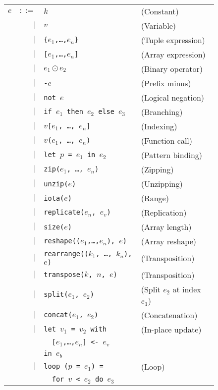 \documentclass[oneside]{memoir}
\begin{document}
\begin{figure}[bt]
\begin{tabular}{lrll}
$e$ & $::=$ & $k$ & (Constant)\\
& $|$ & $v$ & (Variable)\\
& $|$ & \texttt{\{$e_{1}$,\ldots,$e_{n}$\}} & (Tuple expression) \\
& $|$ & \texttt{[$e_{1}$,\ldots,$e_{n}$]} & (Array expression) \\
& $|$ & $e_{1} \odot{} e_{2}$ & (Binary operator) \\
& $|$ & \texttt{-$e$} & (Prefix minus) \\
& $|$ & \texttt{not $e$} & (Logical negation) \\
& $|$ & \texttt{if $e_{1}$ then $e_{2}$ else $e_{3}$} & (Branching) \\
& $|$ & \texttt{$v$[$e_{1}$, \ldots, $e_{n}$]} & (Indexing) \\
& $|$ & \texttt{$v$($e_{1}$, \ldots, $e_{n}$)} & (Function call) \\
& $|$ & \texttt{let $p$ = $e_{1}$ in $e_{2}$} & (Pattern binding) \\
& $|$ & \texttt{zip($e_{1}$, \ldots, $e_{n}$)} & (Zipping) \\
& $|$ & \texttt{unzip($e$)} & (Unzipping) \\
& $|$ & \texttt{iota($e$)} & (Range) \\
& $|$ & \texttt{replicate($e_{n}$, $e_{v}$)} & (Replication) \\
& $|$ & \texttt{size($e$)} & (Array length) \\
& $|$ & \texttt{reshape(($e_{1}$,\ldots,$e_{n}$), $e$)} & (Array reshape) \\
& $|$ & \texttt{rearrange(($k_{1}$, \ldots, $k_{n}$), $e$)} & (Transposition) \\
& $|$ & \texttt{transpose($k$, $n$, $e$)} & (Transposition) \\
& $|$ & \texttt{split($e_{1}$, $e_{2}$)} & (Split $e_{2}$ at index $e_{1}$) \\
& $|$ & \texttt{concat($e_{1}$, $e_{2}$)} & (Concatenation) \\
& $|$ & \texttt{let $v_{1}$ = $v_{2}$ with} & (In-place update) \\
&     & \texttt{\ \ [$e_{1}$,\ldots,$e_{n}$] <- $e_{v}$} \\
&     & \texttt{in $e_{b}$} \\
& $|$ & \texttt{loop ($p$ = $e_{1}$) =} & (Loop) \\
&     & \texttt{\ \ for $v$ < $e_{2}$ do $e_{3}$} \\

\end{tabular}
\end{figure}
\end{document}
